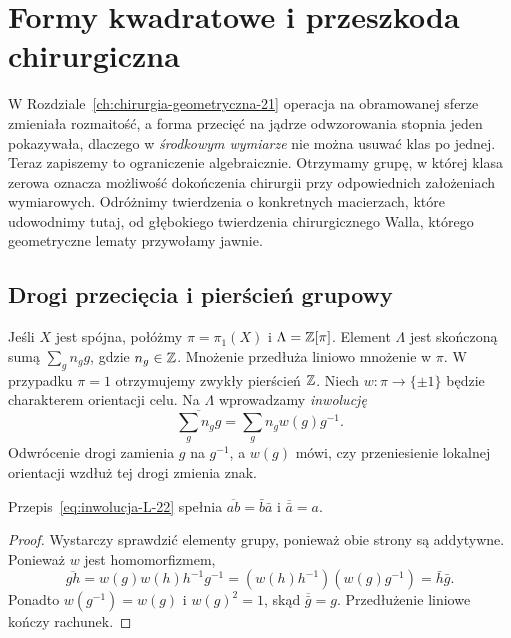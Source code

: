 \chapter{Formy kwadratowe i przeszkoda chirurgiczna}
\label{ch:przeszkoda-chirurgiczna}

W Rozdziale~\ref{ch:chirurgia-geometryczna-21} operacja na
obramowanej sferze zmieniała rozmaitość, a forma przecięć
na jądrze odwzorowania stopnia jeden pokazywała, dlaczego w
\emph{środkowym wymiarze} nie można usuwać klas po jednej.
Teraz zapiszemy to ograniczenie algebraicznie. Otrzymamy
grupę, w której klasa zerowa oznacza możliwość dokończenia
chirurgii przy odpowiednich założeniach wymiarowych.
Odróżnimy twierdzenia o konkretnych macierzach, które
udowodnimy tutaj, od głębokiego twierdzenia chirurgicznego
Walla, którego geometryczne lematy przywołamy jawnie.

\section{Drogi przecięcia i pierścień grupowy}
\label{sec:pi-formy-22}

Jeśli $X$ jest spójna, połóżmy $\pi=\pi_1(X)$ i
$\Lambda=\mathbb{Z}[\pi]$. Element $\Lambda$ jest skończoną
sumą $\sum_g n_g g$, gdzie $n_g\in\mathbb{Z}$. Mnożenie
przedłuża liniowo mnożenie w $\pi$. W przypadku
$\pi=1$ otrzymujemy zwykły pierścień $\mathbb{Z}$.
Niech $w:\pi\to\{\pm1\}$ będzie charakterem
orientacji celu. Na $\Lambda$ wprowadzamy \emph{inwolucję}
\begin{equation}\label{eq:inwolucja-L-22}
 \overline{\sum_g n_g g}
     =\sum_g n_g w(g)g^{-1}.
\end{equation}
Odwrócenie drogi zamienia $g$ na $g^{-1}$, a
$w(g)$ mówi, czy przeniesienie lokalnej orientacji
wzdłuż tej drogi zmienia znak.

\begin{stwierdzenie}
\label{prop:inwolucja-L-22}
Przepis~\eqref{eq:inwolucja-L-22} spełnia
$\overline{ab}=\bar b\bar a$ i
$\overline{\bar a}=a$.
\end{stwierdzenie}
\begin{proof}
Wystarczy sprawdzić elementy grupy, ponieważ obie
strony są addytywne. Ponieważ $w$ jest homomorfizmem,
\[
 \overline{gh}=w(g)w(h)h^{-1}g^{-1}
              =(w(h)h^{-1})(w(g)g^{-1})
              =\bar h\bar g.
\]
Ponadto $w(g^{-1})=w(g)$ i $w(g)^2=1$, skąd
$\overline{\bar g}=g$. Przedłużenie liniowe kończy
rachunek.
\end{proof}

